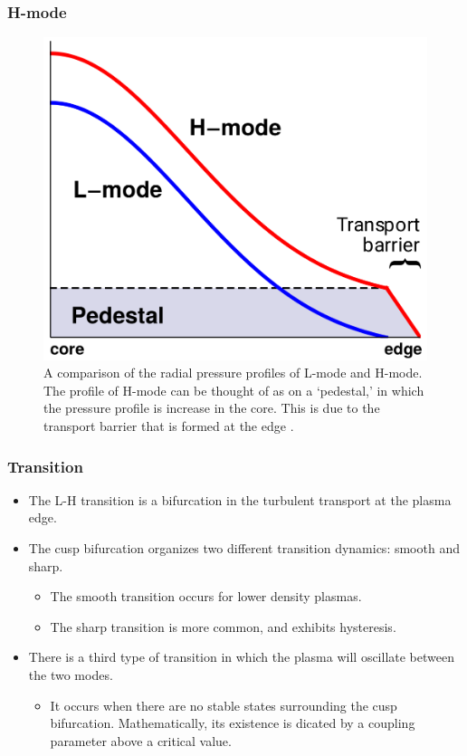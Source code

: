 \documentclass{beamer}
\begin{document}
\begin{frame}
\frametitle{H-mode}
\begin{figure}
	\includegraphics[width=0.5\linewidth]{../../Graphics/L-mode_H-mode_compare.png}
	\caption{A comparison of the radial pressure profiles of L-mode and H-mode.
	The profile of H-mode can be thought of as on a ‘pedestal,’ in which the pressure profile is increase in the core.
	This is due to the transport barrier that is formed at the
	edge \parencite{weymiens_bifurcation_2014}.}
	\label{fig:L-mode_H-mode_compare}
\end{figure}
\end{frame}


\begin{frame}
\frametitle{Transition}
\begin{itemize}
	\item The L-H transition is a bifurcation in the turbulent transport at the plasma edge.
	\item The cusp bifurcation organizes two different transition dynamics: smooth and sharp.
	\begin{itemize}
		\item The smooth transition occurs for lower density plasmas.
		\item The sharp transition is more common, and exhibits hysteresis.
	\end{itemize}
	\item There is a third type of transition in which the plasma will oscillate between the two modes.
	\begin{itemize}
		\item It occurs when there are no stable states surrounding the cusp bifurcation.
		Mathematically, its existence is dicated by a coupling parameter above a critical value.
	\end{itemize}
\end{itemize}
\end{frame}
\end{document}
